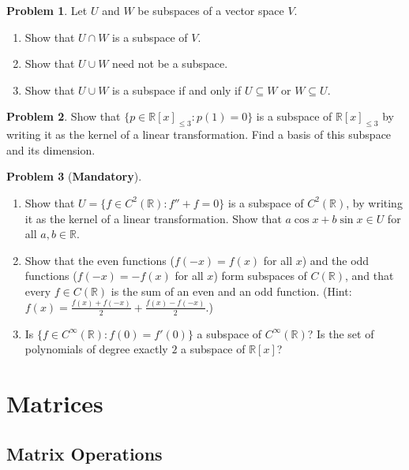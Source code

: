 \documentclass[11pt]{article}
\theoremstyle{definition}
\newtheorem{problem}{Problem}[section]
\newcommand{\mandatory}{\textcolor{red!70!black}{\textbf{Mandatory}}}
\begin{document}
\begin{problem}\label{pr:intersection}
    Let $U$ and $W$ be subspaces of a vector space $V$.
    \begin{enumerate}[label=(\alph*)]
        \item Show that $U \cap W$ is a subspace of $V$.
        \item Show that $U \cup W$ need not be a subspace.
        \item Show that $U \cup W$ is a subspace if and only if $U \subseteq W$ or $W \subseteq U$.
    \end{enumerate}
\end{problem}

\begin{problem}\label{pr:poly-subspace}
    Show that $\{p \in \mathbb{R}[x]_{\leq 3} : p(1) = 0\}$ is a subspace of $\mathbb{R}[x]_{\leq 3}$ by writing it as the kernel of a linear transformation. Find a basis of this subspace and its dimension.
\end{problem}

\begin{problem}[\mandatory]\label{pr:fn-subspaces}
    \begin{enumerate}[label=(\alph*)]
        \item Show that $U = \{f \in C^2(\mathbb{R}) : f'' + f = 0\}$ is a subspace of $C^2(\mathbb{R})$, by writing it as the kernel of a linear transformation. Show that $a\cos x + b\sin x \in U$ for all $a, b \in \mathbb{R}$.
        \item Show that the even functions ($f(-x) = f(x)$ for all $x$) and the odd functions ($f(-x) = -f(x)$ for all $x$) form subspaces of $C(\mathbb{R})$, and that every $f \in C(\mathbb{R})$ is the sum of an even and an odd function. (Hint: $f(x) = \frac{f(x) + f(-x)}{2} + \frac{f(x) - f(-x)}{2}$.)
        \item Is $\{f \in C^\infty(\mathbb{R}) : f(0) = f'(0)\}$ a subspace of $C^\infty(\mathbb{R})$? Is the set of polynomials of degree exactly $2$ a subspace of $\mathbb{R}[x]$?
    \end{enumerate}
\end{problem}

\section{Matrices}

\subsection{Matrix Operations}
\end{document}
